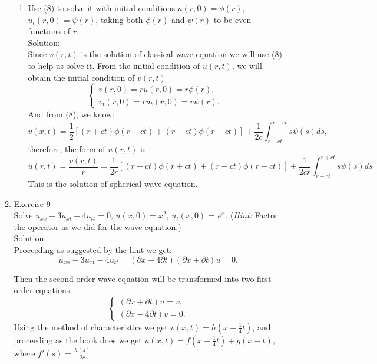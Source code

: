 \documentclass[12pt]{article}%
\begin{document}
\begin{enumerate}
\begin{enumerate}
\begin{enumerate}
            \item Use (8) to solve it with initial conditions $u\left(r,0\right) = \phi\left(r\right)$, $u_t\left(r,0\right) = \psi\left(r\right)$, taking both $\phi\left(r\right)$ and $\psi\left(r\right)$ to be even functions of $r$. \smallskip \\
            Solution:\\
            Since $v(r,t)$ is the solution of classical wave equation we will use (8) to help us solve it.
            From the initial condition of $u(r,t)$, we will obtain the initial condition of $v(r,t)$
            \begin{equation*}
                \begin{cases}
                    v(r,0)=ru(r,0)=r\phi(r),
                    \\
                    v_{t}(r,0)=ru_{t}(r,0)=r\psi(r).
                \end{cases}
            \end{equation*}
            And from (8), we know:
       \[v(x,t)=\frac{1}{2}[(r+ct)\phi(r+ct)+(r-ct)\phi(r-ct)]+\frac{1}{2c}\int_{r-ct}^{r+ct}s\psi(s)ds,\] therefore, the form of $u(r,t)$ is 
          \[u(r,t)=\frac{v(r,t)}{r}=\frac{1}{2r}[(r+ct)\phi(r+ct)+(r-ct)\phi(r-ct)]+\frac{1}{2cr}\int_{r-ct}^{r+ct}s\psi(s)ds\]
          This is the solution of spherical wave equation.
        \end{enumerate}
        
        \item Exercise 9 \smallskip \\
        Solve $u_{xx} - 3 u_{xt} - 4u_{tt} = 0$, $u\left(x,0\right) = x^2$, $u_t\left(x,0\right)$ = $e^x$. (\emph{Hint:} Factor the operator as we did for the wave equation.) \smallskip \\
        Solution:\\
        Proceeding as suggested by the hint we get:
        \[u_{xx} - 3 u_{xt} - 4u_{tt}=(\partial x -4\partial t)(\partial x + \partial t) u=0.\]

        Then the second order wave equation will be transformed into two first order equations.
        \begin{equation*}
            \begin{cases}
                (\partial x + \partial t) u=v,
                \\
                (\partial x -4\partial t)v=0.
            \end{cases}
        \end{equation*}
        Using the method of characteristics we get $v(x,t)=h(x+\frac{1}{4}t)$,
        and proceeding as the book does we get $u(x,t)=f(x+\frac{1}{4}t)+g(x-t)$,
        where $f'(s)=\frac{h(s)}{2c}$.
        

\end{enumerate}
\end{enumerate}
\end{document}
